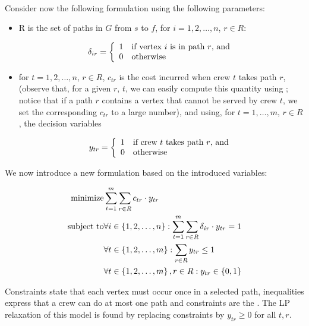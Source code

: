 \paragraph{}
Consider now the following formulation using the following parameters:
\begin{itemize}
 \item R is the set of paths in $G$ from $s$ to $f$,
for $i=1,2,\ldots,n$, $r\in R$:

\begin{equation}
\delta_{ir}=\left\{\begin{array}{ll} 1&\mbox{if vertex $i$ is in path $r$, and}\\0&\mbox{otherwise} \end{array}\right.
\end{equation}

 \item for $t=1,2,\ldots,n$, $r\in R$, $c_{tr}$ is the cost incurred when crew $t$ takes path $r$, (observe that, for a given $r$, $t$, we can easily compute this quantity using ; notice that if a path $r$ contains a vertex that cannot be served by crew $t$, we set the corresponding $c_{tr}$ to a large number), and using, for $t=1,\ldots,m$, $r\in R$, the decision variables
 
\begin{equation}
y_{tr}=\left\{\begin{array}{ll} 1&\mbox{if crew $t$ takes path $r$, and}\\0&\mbox{otherwise} \end{array}\right.
\end{equation}

\end{itemize}
We now introduce a new formulation based on the introduced variables:

\begin{eqnarray}
\mbox{minimize}&\sumieqb[t]{1}{m}{\sumdomain[r]{R}{c_{tr}\cdot y_{tr}}}\eqnlab{cghcsp-m}\\
\mbox{subject to}&\forall i\in\accl{1,2,\ldots,n}:\sumieqb[t]{1}{m}{\sumdomain[r]{R}{\delta_{ir}\cdot y_{tr}}}=1\eqnlab{cghcsp-c1}\\
&\forall t\in\accl{1,2,\ldots,m}:\sumdomain[r]{R}{y_{tr}}\leq1\eqnlab{cghcsp-c2}\\
&\forall t\in\accl{1,2,\ldots,m},r\in R:y_{tr}\in\accl{0,1}\eqnlab{cghcsp-c3}
\end{eqnarray}

Constraints  state that each vertex must occur once in a selected path, inequalities  express that a crew can do at most one path and constraints  are the . The LP relaxation of this model is found by replacing constraints  by $y_{tr}\geq0$ for all $t,r$.

